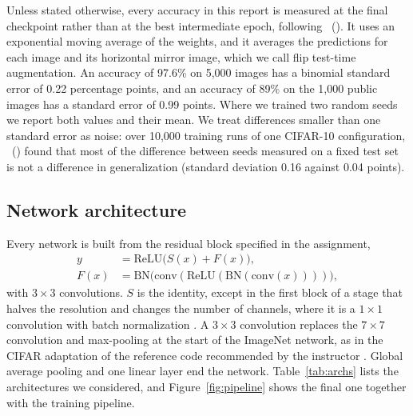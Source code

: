 \documentclass[letterpaper]{article}
\begin{document}
Unless stated otherwise, every accuracy in this report is measured at the final checkpoint rather than at the best
intermediate epoch, following \citeauthor{wightman2021resnet}~(\citeyear{wightman2021resnet}). It uses an exponential moving
average of the weights, and it averages the predictions for each image and its horizontal mirror image, which we call flip
test-time augmentation. An accuracy of 97.6\% on 5,000 images has a binomial standard error of 0.22 percentage points, and an
accuracy of 89\% on the 1,000 public images has a standard error of 0.99 points. Where we trained two random seeds we report both values and their mean. We treat differences smaller than one standard error as noise: over
10,000 training runs of one CIFAR-10 configuration, \citeauthor{jordan2024cifar}~(\citeyear{jordan2024cifar}) found that most of the difference between seeds measured on a fixed test set is not a difference in generalization (standard deviation 0.16 against 0.04 points).

\subsection{Network architecture}
Every network is built from the residual block specified in the assignment,
\begin{align}
y &= \mathrm{ReLU}\big(S(x)+F(x)\big), \nonumber\\
F(x) &= \mathrm{BN}\big(\mathrm{conv}(\mathrm{ReLU}(\mathrm{BN}(\mathrm{conv}(x))))\big),
\end{align}
with $3{\times}3$ convolutions. $S$ is the identity, except in the first block of a stage that halves the resolution and
changes the number of channels, where it is a $1{\times}1$ convolution with batch normalization \cite{ioffe2015batch,he2016deep}.
A $3{\times}3$ convolution replaces the $7{\times}7$ convolution and max-pooling at the start of the ImageNet network, as in
the CIFAR adaptation of the reference code recommended by the instructor \cite{kuangliu}. Global average pooling and one
linear layer end the network. Table~\ref{tab:archs} lists the architectures we considered, and Figure~\ref{fig:pipeline} shows
the final one together with the training pipeline.
\end{document}
